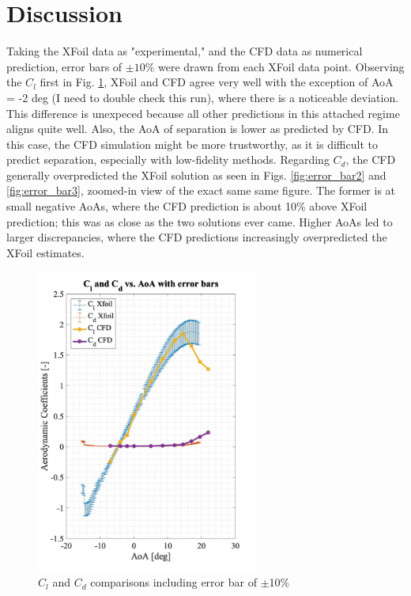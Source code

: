 \section{Discussion}

Taking the XFoil data as "experimental," and the CFD data as numerical prediction, error bars of $\pm10\%$ were drawn from each XFoil data point. Observing the $C_l$ first in Fig. \ref{fig:error_bar1}, XFoil and CFD agree very well with the exception of AoA = -2 deg (I need to double check this run), where there is a noticeable deviation. This difference is unexpeced because all other predictions in this attached regime aligns quite well. Also, the AoA of separation is lower as predicted by CFD. In this case, the CFD simulation might be more trustworthy, as it is difficult to predict separation, especially with low-fidelity methods. Regarding $C_d$, the CFD generally overpredicted the XFoil solution as seen in Figs. \ref{fig:error_bar2} and \ref{fig:error_bar3}, zoomed-in view of the exact same same figure. The former is at small negative AoAs, where the CFD prediction is about 10\% above XFoil prediction; this was as close as the two solutions ever came. Higher AoAs led to larger discrepancies, where the CFD predictions increasingly overpredicted the XFoil estimates.

\begin{figure}[H]
\centering
    \includegraphics[width=0.65\textwidth]{error_bar1.jpg}
    \caption{$C_l$ and $C_d$ comparisons including error bar of $\pm$10\%}
    \label{fig:error_bar1}
\end{figure}

